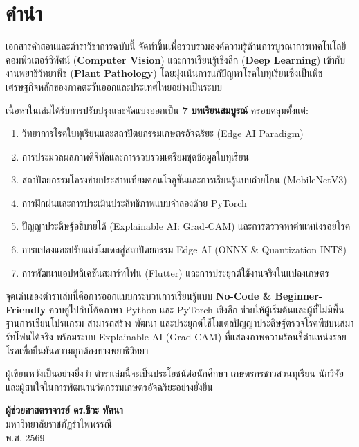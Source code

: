 \documentclass[11pt,twoside,openright]{book}
\begin{document}
\frontmatter
\chapter*{คำนำ}

เอกสารคำสอนและตำราวิชาการฉบับนี้ จัดทำขึ้นเพื่อรวบรวมองค์ความรู้ด้านการบูรณาการเทคโนโลยีคอมพิวเตอร์วิทัศน์ (\textbf{Computer Vision}) และการเรียนรู้เชิงลึก (\textbf{Deep Learning}) เข้ากับงานพยาธิวิทยาพืช (\textbf{Plant Pathology}) โดยมุ่งเน้นการแก้ปัญหาโรคใบทุเรียนซึ่งเป็นพืชเศรษฐกิจหลักของภาคตะวันออกและประเทศไทยอย่างเป็นระบบ

เนื้อหาในเล่มได้รับการปรับปรุงและจัดแบ่งออกเป็น \textbf{7 บทเรียนสมบูรณ์} ครอบคลุมตั้งแต่:
\begin{enumerate}[leftmargin=2em, itemsep=2pt]
    \item วิทยาการโรคใบทุเรียนและสถาปัตยกรรมเกษตรอัจฉริยะ (Edge AI Paradigm)
    \item การประมวลผลภาพดิจิทัลและการรวบรวมเตรียมชุดข้อมูลใบทุเรียน
    \item สถาปัตยกรรมโครงข่ายประสาทเทียมคอนโวลูชันและการเรียนรู้แบบถ่ายโอน (MobileNetV3)
    \item การฝึกฝนและการประเมินประสิทธิภาพแบบจำลองด้วย PyTorch
    \item ปัญญาประดิษฐ์อธิบายได้ (Explainable AI: Grad-CAM) และการตรวจหาตำแหน่งรอยโรค
    \item การแปลงและปรับแต่งโมเดลสู่สถาปัตยกรรม Edge AI (ONNX \& Quantization INT8)
    \item การพัฒนาแอปพลิเคชันสมาร์ทโฟน (Flutter) และการประยุกต์ใช้งานจริงในแปลงเกษตร
\end{enumerate}

จุดเด่นของตำราเล่มนี้คือการออกแบบกระบวนการเรียนรู้แบบ \textbf{No-Code \& Beginner-Friendly} ควบคู่ไปกับโค้ดภาษา Python และ PyTorch เชิงลึก ช่วยให้ผู้เริ่มต้นและผู้ที่ไม่มีพื้นฐานการเขียนโปรแกรม สามารถสร้าง พัฒนา และประยุกต์ใช้โมเดลปัญญาประดิษฐ์ตรวจโรคพืชบนสมาร์ทโฟนได้จริง พร้อมระบบ Explainable AI (Grad-CAM) ที่แสดงภาพความร้อนชี้ตำแหน่งรอยโรคเพื่อยืนยันความถูกต้องทางพยาธิวิทยา

ผู้เขียนหวังเป็นอย่างยิ่งว่า ตำราเล่มนี้จะเป็นประโยชน์ต่อนักศึกษา เกษตรกรชาวสวนทุเรียน นักวิจัย และผู้สนใจในการพัฒนานวัตกรรมเกษตรอัจฉริยะอย่างยั่งยืน

\vspace{1.5cm}
\begin{flushright}
\textbf{ผู้ช่วยศาสตราจารย์ ดร.ชีวะ ทัศนา}\\
มหาวิทยาลัยราชภัฏรำไพพรรณี\\
พ.ศ. 2569
\end{flushright}
\end{document}

